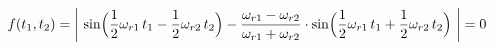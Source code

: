 
\vspace{-20pt}
\begin{equation}
    f(t_1,t_2) = \biggl|\ \sin \Bigl( \frac{1}{2} \omega_{r1}\, t_1 - \frac{1}{2} \omega_{r2}\, t_2 \Bigr) - \frac{\omega_{r1}-\omega_{r2}}{\omega_{r1}+\omega_{r2}} \cdot \sin \Bigl( \frac{1}{2} \omega_{r1}\, t_1 + \frac{1}{2} \omega_{r2}\, t_2 \Bigr) \ \biggr| = 0 
    \label{eqn:min_f}
\end{equation}



